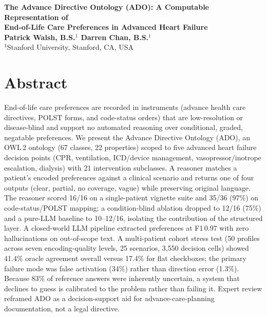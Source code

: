 \documentclass[10pt]{article}
\begin{document}
\begin{center}
{\large\bfseries The Advance Directive Ontology (ADO): A Computable Representation of\\
End-of-Life Care Preferences in Advanced Heart Failure}\\[1em]
{\bfseries Patrick Walsh, B.S.$^{1}$ \quad Darren Chan, B.S.$^{1}$}\\[0.4em]
{$^{1}$Stanford University, Stanford, CA, USA}
\end{center}

\vspace{0.6em}

\section{Abstract}
\begin{itshape}
End-of-life care preferences are recorded in instruments (advance health care directives, POLST forms, and code-status orders) that are low-resolution or disease-blind and support no automated reasoning over conditional, graded, negatable preferences. We present the Advance Directive Ontology (ADO), an OWL\,2 ontology (67 classes, 22 properties) scoped to five advanced heart failure decision points (CPR, ventilation, ICD/device management, vasopressor/inotrope escalation, dialysis) with 21 intervention subclasses. A reasoner matches a patient's encoded preferences against a clinical scenario and returns one of four outputs (clear, partial, no coverage, vague) while preserving original language. The reasoner scored 16/16 on a single-patient vignette suite and 35/36 (97\%) on code-status/POLST mapping; a condition-blind ablation dropped to 12/16 (75\%) and a pure-LLM baseline to 10--12/16, isolating the contribution of the structured layer. A closed-world LLM pipeline extracted preferences at F1\,0.97 with zero hallucinations on out-of-scope text. A multi-patient cohort stress test (50 profiles across seven encoding-quality levels, 25 scenarios, 3{,}550 decision cells) showed 41.4\% oracle agreement overall versus 17.4\% for flat checkboxes; the primary failure mode was false activation (34\%) rather than direction error (1.3\%). Because 83\% of reference answers were inherently uncertain, a system that declines to guess is calibrated to the problem rather than failing it. Expert review reframed ADO as a decision-support aid for advance-care-planning documentation, not a legal directive.
\end{itshape}
\end{document}
